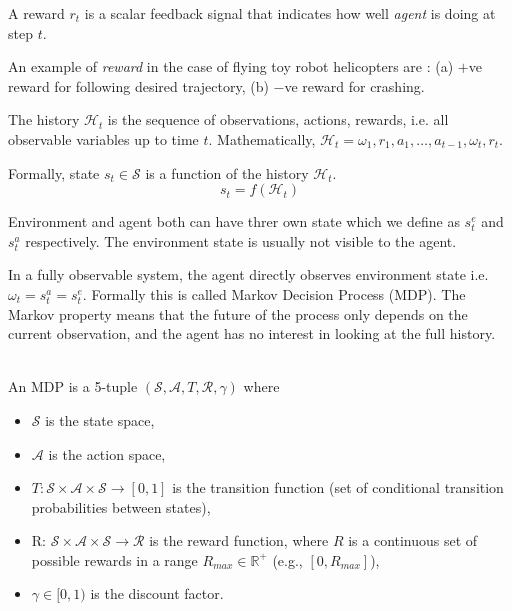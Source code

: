 A reward $r_t$ is a scalar feedback signal that indicates how well {\em agent} is doing at step $t$.

An example of  {\em reward} in the case of flying toy robot helicopters are : (a) $+$ve reward for following desired trajectory, (b) $−$ve reward for crashing.

 The history $\mathcal{H}_t$ is the sequence of observations, actions, rewards, i.e. all observable variables up to time $t$. Mathematically, $\mathcal{H}_t = \omega_1,r_1,a_1,\ldots,a_{t-1},\omega_t,r_t$.

Formally, state $s_t \in \mathcal{S}$ is a function of the history $\mathcal{H}_t$.
$$s_t = f(\mathcal{H}_t)$$

Environment and agent both can have threr own state which we define as $s_t^e$ and $s_t^a$ respectively. The environment state is usually not visible to the agent.

In a fully observable system, the agent directly observes environment state i.e. $\omega_t = s^a_t = s_t^e$. Formally this is called Markov Decision Process (MDP). The Markov property means that the future of the process only
depends on the current observation, and the agent has no interest in
looking at the full history.

\\  An MDP is a 5-tuple $(\mathcal{S}, \mathcal{A}, T, \mathcal{R}, \gamma)$ where
\begin{itemize}
  \item[] $\mathcal{S}$ is the state space,
  \item[] $\mathcal{A}$ is the action space,
  \item[] $T : \mathcal{S} \times \mathcal{A}\times \mathcal{S} \rightarrow [0, 1]$ is the transition function (set of conditional
  transition probabilities between states),
  \item[] R: $\mathcal{S} \times \mathcal{A}\times \mathcal{S} \rightarrow \mathcal{R}$ is the reward function, where $R$ is a continuous set of possible rewards in a range $R_{max} \in \mathbb{R}^+$ (e.g., $[0, R_{max}]$),
  \item[] $\gamma \in  [0, 1)$ is the discount factor.
\end{itemize}


